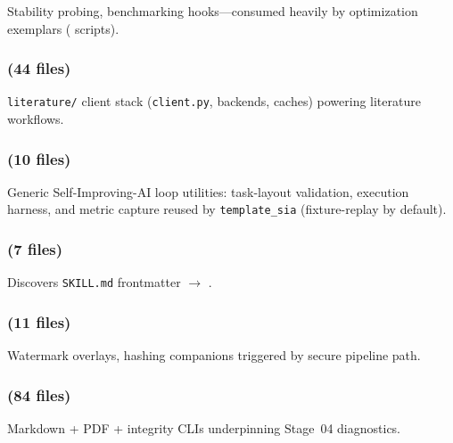 \documentclass[
]{article}
\begin{document}
Stability probing, benchmarking hooks---consumed heavily by optimization
exemplars ( scripts).

\subsubsection{\texorpdfstring{ (44
files)}{infrastructure.search (44 files)}}\label{infrastructure.search-44-files}

\texttt{literature/} client stack (\texttt{client.py}, backends, caches)
powering  literature workflows.

\subsubsection{\texorpdfstring{ (10
files)}{infrastructure.sia (10 files)}}\label{infrastructure.sia-10-files}

Generic Self-Improving-AI loop utilities: task-layout validation,
execution harness, and metric capture reused by \texttt{template\_sia}
(fixture-replay by default).

\subsubsection{\texorpdfstring{ (7
files)}{infrastructure.skills (7 files)}}\label{infrastructure.skills-7-files}

Discovers \texttt{SKILL.md} frontmatter \texorpdfstring{\ensuremath{\to}}{->}
.

\subsubsection{\texorpdfstring{ (11
files)}{infrastructure.steganography (11 files)}}\label{infrastructure.steganography-11-files}

Watermark overlays, hashing companions triggered by secure pipeline
path.

\subsubsection{\texorpdfstring{ (84
files)}{infrastructure.validation (84 files)}}\label{infrastructure.validation-84-files}

Markdown + PDF + integrity CLIs underpinning Stage~04 diagnostics.
\end{document}
